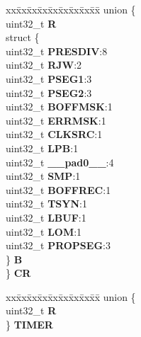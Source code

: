 \begin{DoxyCompactItemize}
\begin{tabbing}
\end{tabbing}\item 
\mbox{\label{structFLEXCAN2__tag_a0db09ede6bfacb2c95ec30b40edb75b4}} 
\begin{tabbing}
xx\=xx\=xx\=xx\=xx\=xx\=xx\=xx\=xx\=\kill
union \{\\
\>uint32\_t {\bfseries R}\\
\>struct \{\\
\>\>uint32\_t {\bfseries PRESDIV}:8\\
\>\>uint32\_t {\bfseries RJW}:2\\
\>\>uint32\_t {\bfseries PSEG1}:3\\
\>\>uint32\_t {\bfseries PSEG2}:3\\
\>\>uint32\_t {\bfseries BOFFMSK}:1\\
\>\>uint32\_t {\bfseries ERRMSK}:1\\
\>\>uint32\_t {\bfseries CLKSRC}:1\\
\>\>uint32\_t {\bfseries LPB}:1\\
\>\>uint32\_t {\bfseries \_\_pad0\_\_}:4\\
\>\>uint32\_t {\bfseries SMP}:1\\
\>\>uint32\_t {\bfseries BOFFREC}:1\\
\>\>uint32\_t {\bfseries TSYN}:1\\
\>\>uint32\_t {\bfseries LBUF}:1\\
\>\>uint32\_t {\bfseries LOM}:1\\
\>\>uint32\_t {\bfseries PROPSEG}:3\\
\>\} {\bfseries B}\\
\} {\bfseries CR}\\

\end{tabbing}\item 
\mbox{\label{structFLEXCAN2__tag_acf30c7b847b216476ab0f0cb2a64a4f9}} 
\begin{tabbing}
xx\=xx\=xx\=xx\=xx\=xx\=xx\=xx\=xx\=\kill
union \{\\
\>uint32\_t {\bfseries R}\\
\} {\bfseries TIMER}\\


\end{tabbing}
\end{DoxyCompactItemize}
